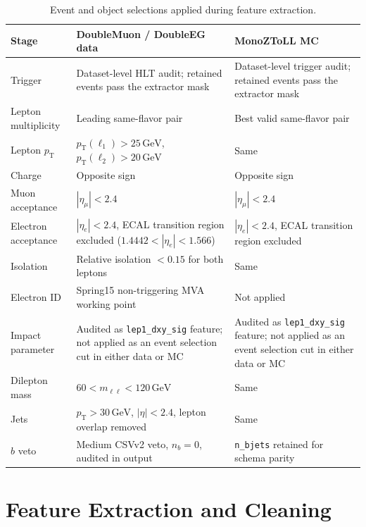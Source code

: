 \documentclass[11pt,a4paper,twocolumn]{article}
\newcommand{\GeV}{\text{GeV}}
\begin{document}
\begin{table}[!tbp]
\centering
\caption{Event and object selections applied during feature extraction.}
\label{tab:extraction-cuts}

\begin{tabular}{p{} p{} p{}}
\toprule
Stage & DoubleMuon / DoubleEG data & MonoZToLL MC \\
\midrule
Trigger & Dataset-level HLT audit; retained events pass the extractor mask &
Dataset-level trigger audit; retained events pass the extractor mask \\
Lepton multiplicity & Leading same-flavor pair & Best valid same-flavor pair \\
Lepton $p_{\mathrm{T}}$ & $p_{\mathrm{T}}(\ell_1)>25\,\GeV$, $p_{\mathrm{T}}(\ell_2)>20\,\GeV$ &
Same \\
Charge & Opposite sign & Opposite sign \\
Muon acceptance & $|\eta_{\mu}|<2.4$ & $|\eta_{\mu}|<2.4$ \\
Electron acceptance & $|\eta_e|<2.4$, ECAL transition region excluded ($1.4442<|\eta_e|<1.566$) & $|\eta_e|<2.4$, ECAL transition region excluded \\
Isolation & Relative isolation $<0.15$ for both leptons & Same \\
Electron ID & Spring15 non-triggering MVA working point & Not applied \\
Impact parameter & Audited as \texttt{lep1\_dxy\_sig} feature; not applied as an event selection cut in either data or MC & Audited as \texttt{lep1\_dxy\_sig} feature; not applied as an event selection cut in either data or MC \\
Dilepton mass & $60<m_{\ell\ell}<120\,\GeV$ & Same \\
Jets & $p_{\mathrm{T}}>30\,\GeV$, $|\eta|<2.4$, lepton overlap removed & Same \\
$b$ veto & Medium CSVv2 veto, $n_b=0$, audited in output & \texttt{n\_bjets} retained for schema parity \\
\bottomrule
\end{tabular}

\end{table}

\section{Feature Extraction and Cleaning}
\label{sec:preprocessing}
\end{document}
